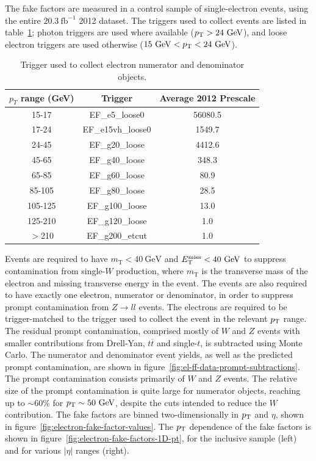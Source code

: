 The fake factors are measured in a control sample of single-electron events, using the entire $20.3~\mbox{fb}^{-1}$ 2012 dataset. The triggers used to collect events are listed in table~\ref{table:electron-fake-factor-triggers}; photon triggers are used where available ($p_{\text{T}}>24~\mbox{GeV}$), and loose electron triggers are used otherwise ($15~\mbox{GeV}<p_{\text{T}}<24~\mbox{GeV}$). 

\begin{table}[h]
  \centering
  \begin{tabular}{ccc}
  \hline
	$p_T$ range (GeV) & Trigger & Average 2012 Prescale \\
	\hline
	15-17 & EF\_e5\_loose0 & 56080.5\\
	17-24 & EF\_e15vh\_loose0 & 1549.7\\
	24-45 & EF\_g20\_loose & 4412.6\\
	45-65 & EF\_g40\_loose & 348.3\\
	65-85 & EF\_g60\_loose & 80.9\\
	85-105 & EF\_g80\_loose & 28.5\\
	105-125 & EF\_g100\_loose & 13.0\\
	125-210 & EF\_g120\_loose & 1.0\\
	$>$210 & EF\_g200\_etcut & 1.0\\ \hline
  \end{tabular}
  \caption{Trigger used to collect electron numerator and denominator objects.}
  \label{table:electron-fake-factor-triggers}
\end{table}

Events are required to have $m_{\mathrm{T}}<40~\mbox{GeV}$ and $E_{\text{T}}^{\text{miss}}<40~\mbox{GeV}$ to suppress contamination from single-$W$ production, where $m_{\mathrm{T}}$ is the transverse mass of the electron and missing transverse energy in the event. The events are also required to have exactly one electron, numerator or denominator, in order to suppress prompt contamination from $Z\rightarrow ll$ events. The electrons are required to be trigger-matched to the trigger used to collect the event in the relevant $p_{\text{T}}$ range. The residual prompt contamination, comprised mostly of $W$ and $Z$ events with smaller contributions from Drell-Yan, $t\overline{t}$ and single-$t$, is subtracted using Monte Carlo. The numerator and denominator event yields, as well as the predicted prompt contamination, are shown in figure~\ref{fig:el-ff-data-prompt-subtractions}. The prompt contamination consists primarily of $W$ and $Z$ events. The relative size of the prompt contamination is quite large for numerator objects, reaching up to $\sim60\%$ for $p_{\text{T}}\sim 50~\mbox{GeV}$, despite the cuts intended to reduce the $W$ contribution. The fake factors are binned two-dimensionally in $p_{\text{T}}$ and $\eta$, shown in figure~\ref{fig:electron-fake-factor-values}. The $p_{\text{T}}$ dependence of the fake factors is shown in figure~\ref{fig:electron-fake-factors-1D-pt}, for the inclusive sample (left) and for various $|\eta|$ ranges (right).

